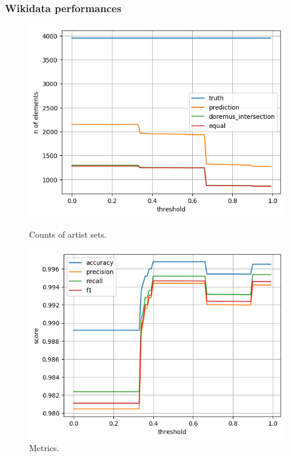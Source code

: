 \documentclass[paper=a4, fontsize=11pt]{scrartcl}
\begin{document}
\subsubsection{Wikidata performances}
\begin{figure}[!htb]
  \centering
  \begin{minipage}[b]{0.49\textwidth}
    \includegraphics[width=\textwidth]{images/count_artists_wiki.png}
    \caption{Counts of artist sets.}
    \label{fig:counts_artists_wiki}
  \end{minipage}
  \hfill
  \begin{minipage}[b]{0.49\textwidth}
    \includegraphics[width=\textwidth]{images/metrics_artists_wiki.png}
    \caption{Metrics.}
    \label{fig:metrics_artists_wiki}
  \end{minipage}
\end{figure}
\end{document}
